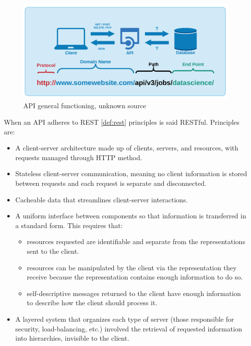 \documentclass[
  12pt,
  a4paper,
  oneside]{book}
\providecommand{\tightlist}{%
  \setlength{\itemsep}{0pt}\setlength{\parskip}{0pt}}
\theoremstyle{definition}
\theoremstyle{definition}
\theoremstyle{definition}
\theoremstyle{remark}
\begin{document}
\begin{figure}
\centering
\includegraphics{images/api_stru.png}
\caption{\label{fig:apigenstru}API general functioning, unknown source}
\end{figure}

When an API adheres to REST \ref{def:rest} principles is said RESTful. Principles are:

\begin{itemize}
\tightlist
\item
  A client-server architecture made up of clients, servers, and resources, with requests managed through HTTP method.
\item
  Stateless client-server communication, meaning no client information is stored between requests and each request is separate and disconnected.
\item
  Cacheable data that streamlines client-server interactions.
\item
  A uniform interface between components so that information is transferred in a standard form. This requires that:

  \begin{itemize}
  \tightlist
  \item
    resources requested are identifiable and separate from the representations sent to the client.
  \item
    resources can be manipulated by the client via the representation they receive because the representation contains enough information to do so.
  \item
    self-descriptive messages returned to the client have enough information to describe how the client should process it.
  \end{itemize}
\item
  A layered system that organizes each type of server (those responsible for security, load-balancing, etc.) involved the retrieval of requested information into hierarchies, invisible to the client.
\end{itemize}
\end{document}
